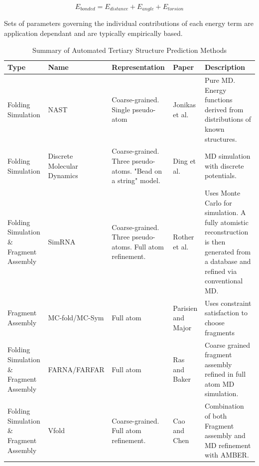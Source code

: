 \documentclass[journal]{IEEEtran}
\begin{document}
\begin{equation}
\label{eq:bonded-interactions}
	E_{bonded} = E_{distance} + E_{angle} + E_{torsion}
\end{equation}

Sets of parameters governing the individual contributions of each energy term are application dependant and are typically empirically based. 

\begin{table}[t]
\centering
\caption{Summary of Automated Tertiary Structure Prediction Methods}
\label{table:tertiary-prediction-papers}
\begin{tabular}{|p{3cm}|p{2cm}|p{3cm}|l|p{5cm}|}
\hline
\textbf{Type}                           & \textbf{Name}               & \textbf{Representation}                                       & \textbf{Paper} & \textbf{Description} \\ \hline
Folding Simulation                      & NAST                        & Coarse-grained. Single pseudo-atom                            &  Jonikas et al.\cite{jonikas2009coarse} & Pure MD. Energy functions derived from distributions of known structures. \\ \hline
Folding Simulation                      & Discrete Molecular Dynamics & Coarse-grained. Three pseudo-atoms. "Bead on a string" model. & Ding et al. \cite{ding2008ab} & MD simulation with discrete potentials. \\ \hline
Folding Simulation \& Fragment Assembly & SimRNA                      & Coarse-grained. Three pseudo-atoms. Full atom refinement.     &  Rother et al. \cite{rother2012template} &   Uses Monte Carlo for simulation. A fully atomistic reconstruction is then generated from a database and refined via conventional MD. \\ \hline
Fragment Assembly                       & MC-fold/MC-Sym              & Full atom                                                     &  Parisien and Major\cite{parisien2008mc} &  Uses constraint satisfaction to choose fragments  \\ \hline
Folding Simulation \& Fragment Assembly & FARNA/FARFAR                & Full atom                                                     &  Ras and Baker \cite{das2007automated}   &   Coarse grained fragment assembly refined in full atom MD simulation.                   \\ \hline
Folding Simulation \& Fragment Assembly & Vfold                       & Coarse-grained. Full atom refinement.                         &  Cao and Chen \cite{cao2011physics}  &  Combination of both Fragment assembly and MD refinement with AMBER. \\ \hline
\end{tabular}
\end{table}
\end{document}
